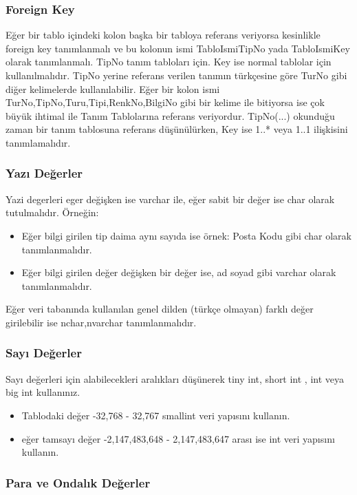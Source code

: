 \documentclass[10pt,a4paper,draft]{article}
\begin{document}
\subsubsection{Foreign Key}
Eğer bir tablo içindeki kolon başka bir tabloya referans veriyorsa 
kesinlikle foreign key tanımlanmalı ve bu			kolonun ismi TabloIsmiTipNo yada 
TabloIsmiKey olarak tanımlanmalı. TipNo tanım tabloları için. Key ise normal 
tablolar			için kullanılmalıdır.	
TipNo yerine referans verilen tanımın türkçesine göre TurNo
gibi diğer kelimelerde kullanılabilir.
Eğer bir kolon ismi TurNo,TipNo,Turu,Tipi,RenkNo,BilgiNo
gibi bir kelime ile bitiyorsa ise çok büyük ihtimal ile
Tanım Tablolarına referans veriyordur.
TipNo(...) okunduğu zaman bir tanım tablosuna referans düşünülürken, Key ise   1..* veya 1..1 ilişkisini tanımlamalıdır.		 


\subsubsection{Yazı Değerler}
Yazi degerleri eger değişken ise varchar ile, eğer sabit bir değer ise char olarak tutulmalıdır. Örneğin:

\begin{itemize}
\item Eğer bilgi girilen tip daima aynı sayıda ise örnek: Posta Kodu gibi char olarak tanımlanmalıdır.		 
\item Eğer bilgi girilen değer değişken bir değer ise, ad soyad gibi varchar olarak tanımlanmalıdır.
\end{itemize} 

Eğer veri tabanında kullanılan genel dilden (türkçe olmayan) farklı değer girilebilir ise nchar,nvarchar tanımlanmalıdır.

\subsubsection{Sayı Değerler}
Sayı değerleri için alabilecekleri aralıkları düşünerek tiny int, short int , int veya big int kullanınız. 

\begin{itemize}
\item   Tablodaki değer  -32,768 - 32,767   smallint veri yapısını kullanın.
\item   eğer tamsayı değer  -2,147,483,648 - 2,147,483,647 arası ise int veri yapısını kullanın.
\end{itemize} 

\subsubsection{Para ve Ondalık Değerler}
\end{document}
